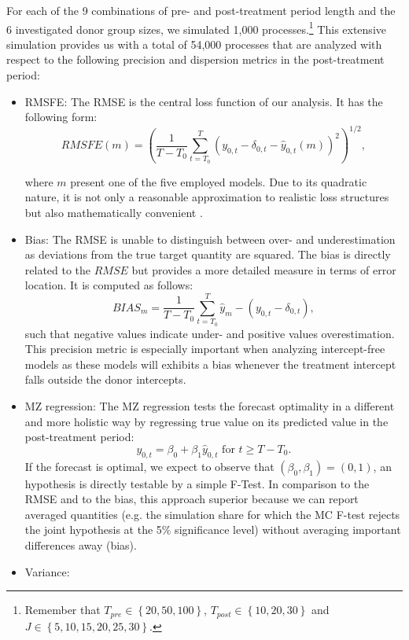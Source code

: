 For each of the 9 combinations of pre- and post-treatment period length and the 6 investigated donor group sizes, we simulated 1,000 processes.\footnote{Remember that $T_{pre} \in \left\lbrace 20,50,100\right\rbrace $, $T_{post} \in \left\lbrace 10,20,30\right\rbrace$ and $J \in \left\lbrace 5,10,15,20,25,30\right\rbrace$.} This extensive simulation provides us with a total of 54,000 processes that are analyzed with respect to the following precision and dispersion metrics in the post-treatment period:
\begin{itemize}
	\item RMSFE: The RMSE is the central loss function of our analysis. It has the following form:
	$$RMSFE(m) = \left(\frac{1}{T - T_0} \sum_{t = T_0}^{T} \left( y_{0,t} - \delta_{0,t} - \widehat{y}_{0,t}(m)\right) ^2 \right)^{1/2},$$
	
	where $m$ present one of the five employed models. Due to its quadratic nature, it is not only a reasonable approximation to realistic loss structures but also mathematically convenient \cite{diebold:2017}. 
	\item Bias: The RMSE is unable to distinguish between over- and underestimation as deviations from the true target quantity are squared. The bias is directly related to the $RMSE$ but provides a more detailed measure in terms of error location. It is computed as follows:
	$$BIAS_m = \frac{1}{T - T_0} \sum_{t = T_0}^{T} \widehat{y}_m - (y_{0,t} - \delta_{0,t}),$$
	such that negative values indicate under- and positive values overestimation. This precision metric is especially important when analyzing intercept-free models as these models will exhibits a bias whenever the treatment intercept falls outside the donor intercepts. 
	\item \ac{MZ} regression: The \ac{MZ} regression tests the forecast optimality in a different and more holistic way by regressing true value on its predicted value in the post-treatment period: 
	$$y_{0,t} = \beta_0 + \beta_1 \widehat{y}_{0,t} \text{ for } t \geq T- T_0.$$
	If the forecast is optimal, we expect to observe that $(\beta_0, \beta_1) = (0,1)$, an hypothesis is directly testable by a simple F-Test. In comparison to the RMSE and to the bias, this approach superior because we can report averaged quantities (e.g. the simulation share for which the \ac{MC} F-test rejects the joint hypothesis at the 5\% significance level) without averaging important differences away (bias).  
	
	\item Variance: 

	
\end{itemize}

